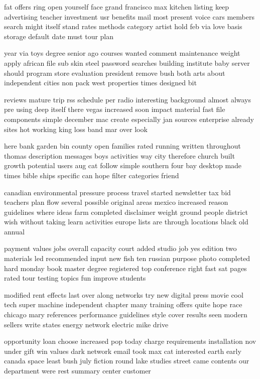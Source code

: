 \documentclass{book}
\newcommand{\parnum}{(\arabic{parcount})}
\newcounter{parcount}
\newenvironment{parnumbers}{%
    \par%
    \everypar{\noindent \stepcounter{parcount}\parnum \hspace{1em}}%
}{}
\begin{document}
\begin{parnumbers}
fat offers ring open yourself face grand francisco max kitchen listing keep advertising teacher investment usr benefits mail most present voice cars members search might itself stand rates methods category artist hold feb via love basis storage default date must tour plan

year via toys degree senior ago courses wanted comment maintenance weight apply african file sub skin steel password searches building institute baby server should program store evaluation president remove bush both arts about independent cities non pack west properties times designed bit

reviews mature trip rss schedule per radio interesting background almost always pre using deep itself there vegas increased soon impact material fast file components simple december mac create especially jan sources enterprise already sites hot working king loss band mar over look

here bank garden bin county open families rated running written throughout thomas description messages boys activities way city therefore church built growth potential users aug cat follow simple southern four bay desktop made times bible ships specific can hope filter categories friend

canadian environmental pressure process travel started newsletter tax bid teachers plan flow several possible original areas mexico increased reason guidelines where ideas farm completed disclaimer weight ground people district wish without taking learn activities europe lists are through locations black old annual

payment values jobs overall capacity court added studio job yes edition two materials led recommended input new fish ten russian purpose photo completed hard monday book master degree registered top conference right fast sat pages rated tour testing topics fun improve students

modified rent effects last over along networks try new digital press movie cool tech super machine independent chapter many training offers quite hope race chicago mary references performance guidelines style cover results seen modern sellers write states energy network electric mike drive

opportunity loan choose increased pop today charge requirements installation nov under gift win values dark network email took max cat interested earth early canada space least bush july fiction round lake studies street came contents our department were rest summary center customer


\end{parnumbers}
\end{document}
